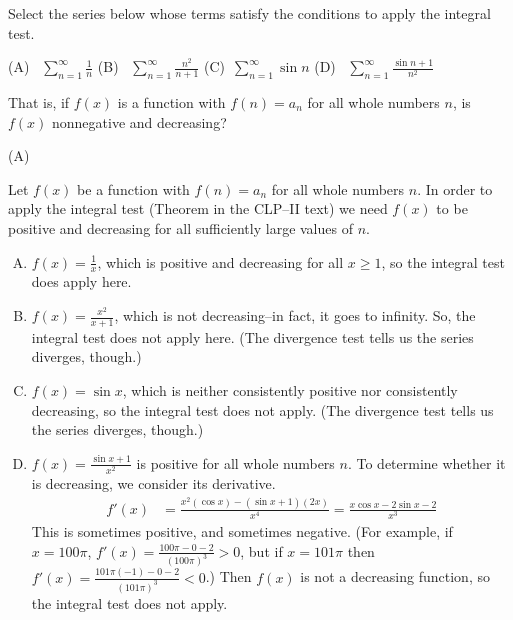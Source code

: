 \begin{Mquestion}
Select the series below whose terms satisfy the conditions to apply the integral test.

\hfill(A)~ $\displaystyle\sum_{n=1}^\infty \frac{1}{n}$ \hfill
\hfill(B)~ $\displaystyle\sum_{n=1}^\infty \frac{n^2}{n+1}$
\hfill (C)~$\displaystyle\sum_{n=1}^\infty \sin n$
\hfill(D)~ $\displaystyle\sum_{n=1}^\infty \frac{\sin n+1}{n^2}$\hfill~
\end{Mquestion}
\begin{hint}
That is, if $f(x)$ is a function with $f(n)=a_n$ for all whole numbers $n$, is $f(x)$ nonnegative and decreasing?
\end{hint}
\begin{answer}
(A)
\end{answer}
\begin{solution}
Let $f(x)$ be a function with $f(n)=a_n$ for all whole numbers $n$.
In order to apply the integral test (Theorem 
 in the CLP--II text) we need $f(x)$ to be positive and decreasing for all sufficiently large values of $n$.
\begin{enumerate}[(A)]
\item $f(x) = \frac{1}{x}$, which is positive and decreasing for all $x \ge 1$, so the integral test does apply here.
\item $f(x)=\frac{x^2}{x+1}$, which is not decreasing--in fact, it goes to infinity. So, the integral test does not apply here. (The divergence test tells us the series diverges, though.)
\item $f(x) = \sin x$, which is neither consistently positive nor consistently decreasing, so the integral test does not apply. (The divergence test tells us the series diverges, though.)
\item $f(x)=\frac{\sin x+1}{x^2}$ is positive for all whole numbers $n$. To determine whether it is decreasing, we consider its derivative.
\begin{align*}
f'(x)&=\frac{x^2(\cos x)-(\sin x+1)(2x)}{x^4}=\frac{x\cos x - 2\sin x -2}{x^3}
\end{align*}
This is sometimes positive, and sometimes negative. (For example, if $x=100\pi$, $f'(x) = \frac{100\pi-0-2}{(100\pi)^3}>0$, but if $x=101\pi$ then $f'(x)=\frac{101\pi(-1)-0-2}{(101\pi)^3}<0$.) Then $f(x)$ is not a decreasing function, so the integral test does not apply.
\end{enumerate}
\end{solution}

